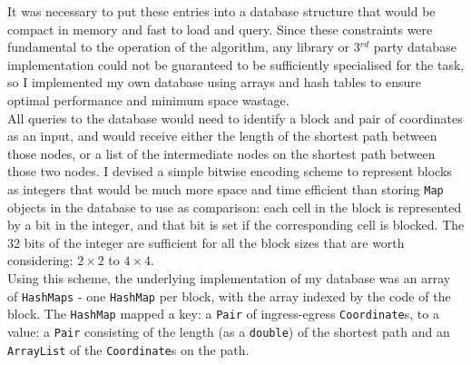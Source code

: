 \documentclass[12pt,twoside,notitlepage]{report}
\begin{document}
\noindent
It was necessary to put these entries into a database structure that would be compact in memory and fast to load and query. Since these constraints were fundamental to the operation of the algorithm, any library or 3$^{rd}$ party database implementation could not be guaranteed to be sufficiently specialised for the task, so I implemented my own database using arrays and hash tables to ensure optimal performance and minimum space wastage.\\

\noindent
All queries to the database would need to identify a block and pair of coordinates as an input, and would receive either the length of the shortest path between those nodes, or a list of the intermediate nodes on the shortest path between those two nodes. I devised a simple bitwise encoding scheme to represent blocks as integers that would be much more space and time efficient than storing {\tt Map} objects in the database to use as comparison: each cell in the block is represented by a bit in the integer, and that bit is set if the corresponding cell is blocked. The 32 bits of the integer are sufficient for all the block sizes that are worth considering: $2 \times 2$ to $4 \times 4$.\footnotemark[1]\\

\noindent
Using this scheme, the underlying implementation of my database was an array of {\tt  HashMaps} - one {\tt HashMap} per block, with the array indexed by the code of the block. The {\tt HashMap} mapped a key: a {\tt Pair} of ingress-egress {\tt Coordinate}s, to a value: a {\tt Pair} consisting of the length (as a {\tt double}) of the shortest path and an {\tt ArrayList} of the {\tt Coordinate}s on the path.\\
\end{document}
